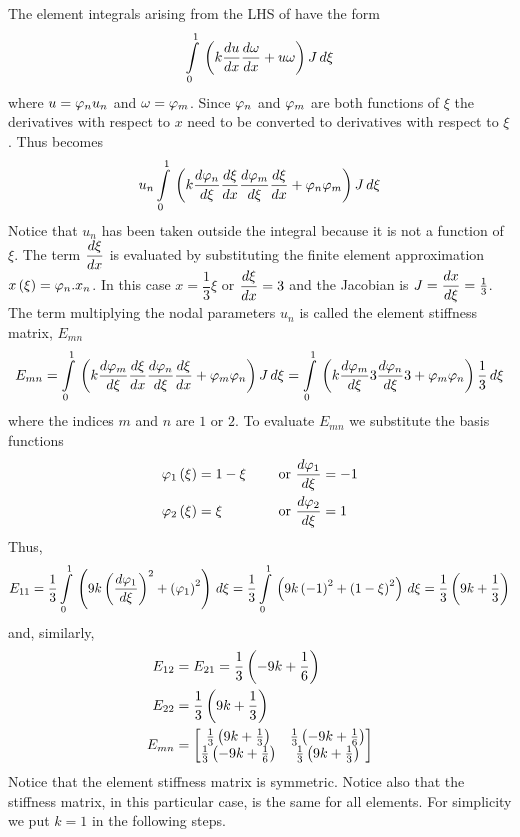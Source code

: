The element integrals arising from the LHS of 
have the form
\begin{equation}
    \displaystyle\int\limits_{0}^{1} \,\left( k \dfrac{ d u}{d x}  \dfrac{ d \omega}{d x}  + u\omega \right)J\,d\xi 
  \label{eqn:element_integrals_1}
\end{equation}
where $u =  \varphi_{n} u_{n}$ and $\omega =  \varphi_{m} $. Since $ \varphi_{n} $ and
$ \varphi_{m} $ are both functions of $\xi$ the derivatives with respect to $x$
need to be converted to derivatives with respect to $\xi$.  Thus
 becomes
\begin{equation}
  u_{n}  \displaystyle\int\limits_{0}^{1} \,\left( k \dfrac{ d  \varphi_{n} }{d \xi}  \dfrac{ d \xi}{d x} 
     \dfrac{ d  \varphi_{m} }{d \xi}  \dfrac{ d \xi}{d x} + \varphi_{n}  \varphi_{m}  \right)J\,d\xi 
  \label{eqn:element_integrals_2}
\end{equation}
Notice that $u_{n}$ has been taken outside the integral because it is not a
function of $\xi$. The term $ \dfrac{ d \xi}{d x} $ is evaluated by substituting the
finite element approximation $ x\left( \xi \right) = \varphi_{n} .x_{n}$. In this case
 $x=\dfrac13\xi$ or $ \dfrac{ d \xi}{d x} = 3$ and the Jacobian is
$J= \dfrac{ d x}{d \xi} =\frac13$. The term multiplying the nodal parameters $u_{n}$ is
called the element stiffness matrix, $E_{mn}$
\begin{equation*}
  E_{mn}=  \displaystyle\int\limits_{0}^{1} \,\left( k \dfrac{ d  \varphi_{m} }{d \xi}  \dfrac{ d \xi}{d x} 
     \dfrac{ d  \varphi_{n} }{d \xi}  \dfrac{ d \xi}{d x} + \varphi_{m}  \varphi_{n}  \right)J\,d\xi 
    =  \displaystyle\int\limits_{0}^{1} \,\left( k \dfrac{ d  \varphi_{m} }{d \xi} 3 \dfrac{ d  \varphi_{n} }{d \xi} 3
    + \varphi_{m}  \varphi_{n}  \right)\frac13\,d\xi 
\end{equation*}
where the indices $m$ and $n$ are $1$ or $2$. To evaluate $E_{mn}$ we substitute 
the basis functions
\begin{alignat*}{2}
     \varphi_{1} \left( \xi \right)  &= 1-\xi &\quad\text{ or }  \dfrac{ d  \varphi_{1} }{d \xi} &= -1 \\
     \varphi_{2} \left( \xi \right)  &= \xi &\quad\text{ or }  \dfrac{ d  \varphi_{2} }{d \xi} &= 1
\end{alignat*}
Thus,
\begin{equation*}
  E_{11}=\frac13  \displaystyle\int\limits_{0}^{1} \,\left( 9k\left(  \dfrac{ d  \varphi_{1} }{d \xi}  \right)^{2}
    +\left(  \varphi_{1}  \right)^{2} \right)\,d\xi =\frac13  \displaystyle\int\limits_{0}^{1} \,\left( 9k\left( -1 \right)^{2}+
    \left( 1-\xi \right)^{2} \right)\,d\xi =\frac13 \left( 9k+\frac13 \right)
\end{equation*}
and, similarly, 
\begin{align*}
  E_{12} &= E_{21} =\frac13 \left( -9k + \frac16 \right) \\
  E_{22} &= \frac13 \left( 9k+\frac13 \right) \\ 
  E_{mn} &=
  \begin{bmatrix}
    \frac13 \left( 9k+\frac13 \right) & \frac13 \left( -9k+\frac16 \right) \\
    \frac13 \left( -9k+\frac16 \right) & \frac13 \left( 9k+\frac13 \right)
  \end{bmatrix}
\end{align*}
Notice that the element stiffness matrix is symmetric. Notice also that 
the stiffness matrix, in this particular case, is the same for all elements. 
For simplicity we put $k=1$ in the following steps.

